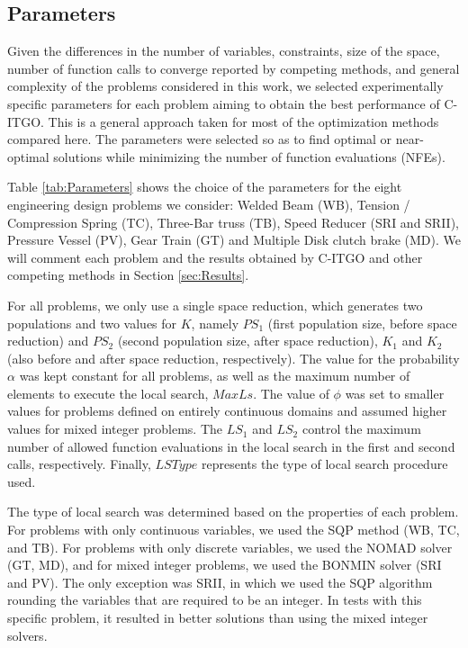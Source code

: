 \subsection{Parameters}

Given the differences in the number of variables, constraints, size of the space, number of function calls to converge reported by competing methods, and general complexity of the problems considered in this work, we selected experimentally specific parameters for each problem aiming to obtain the best performance of C-ITGO. This is a general approach taken for most of the optimization methods compared here. The parameters were selected so as to find optimal or near-optimal solutions while minimizing the number of function evaluations (NFEs).

Table \ref{tab:Parameters} shows the choice of the parameters for the eight engineering design problems we consider: Welded Beam (WB), Tension / Compression Spring (TC), Three-Bar truss (TB), Speed Reducer (SRI and SRII), Pressure Vessel (PV), Gear Train (GT) and Multiple Disk clutch brake (MD). We will comment each problem and the results obtained by C-ITGO and other competing methods in Section \ref{sec:Results}.



For all problems, we only use a single space reduction, which generates two populations and two values for $K$, namely $PS_1$ (first population size, before space reduction) and $PS_2$ (second population size, after space reduction), $K_1$ and $K_2$ (also before and after space reduction, respectively). The value for the probability $\alpha$ was kept constant for all problems, as well as the maximum number of elements to execute the local search, $MaxLs$. The value of $\phi$ was set to smaller values for problems defined on entirely continuous domains and assumed higher values for mixed integer problems. The $LS_1$ and $LS_2$ control the maximum number of allowed function evaluations in the local search in the first and second calls, respectively. Finally, $LSType$ represents the type of local search procedure used. %

The type of local search was determined based on the properties of each problem. For problems with only continuous variables, we used the SQP method (WB, TC, and TB). For problems with only discrete variables, we used the NOMAD solver (GT, MD), and for mixed integer problems, we used the BONMIN solver (SRI and PV). The only exception was SRII, in which we used the SQP algorithm rounding the variables that are required to be an integer. In tests with this specific problem, it resulted in better solutions than using the mixed integer solvers.